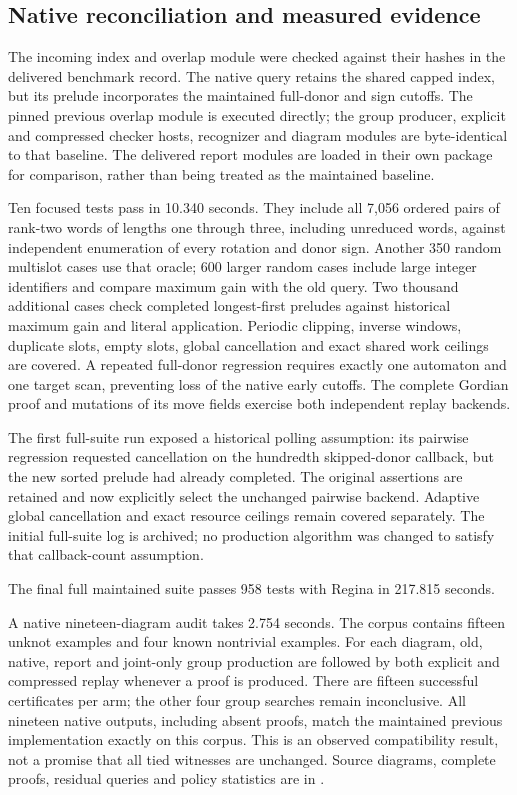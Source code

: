 \subsection{Native reconciliation and measured evidence}

The incoming index and overlap module were checked against their hashes in
the delivered benchmark record. The native query retains the shared capped
index, but its prelude incorporates the maintained full-donor and sign
cutoffs. The pinned previous overlap module is executed directly; the group
producer, explicit and compressed checker hosts, recognizer and diagram
modules are byte-identical to that baseline. The delivered report modules
are loaded in their own package for comparison, rather than being treated
as the maintained baseline.

Ten focused tests pass in 10.340 seconds. They include all 7,056 ordered pairs
of rank-two words of lengths one through three, including unreduced words,
against independent enumeration of every rotation and donor sign. Another
350 random multislot cases use that oracle; 600 larger random cases include
large integer identifiers and compare maximum gain with the old query.
Two thousand additional cases check completed longest-first preludes against
historical maximum gain and literal application. Periodic clipping, inverse
windows, duplicate slots, empty slots, global cancellation and exact shared
work ceilings are covered. A repeated full-donor regression requires exactly
one automaton and one target scan, preventing loss of the native early cutoffs.
The complete Gordian proof and mutations of its move fields exercise both
independent replay backends.

The first full-suite run exposed a historical polling assumption: its
pairwise regression requested cancellation on the hundredth skipped-donor
callback, but the new sorted prelude had already completed. The original
assertions are retained and now explicitly select the unchanged pairwise
backend. Adaptive global cancellation and exact resource ceilings remain
covered separately. The initial full-suite log is archived; no production
algorithm was changed to satisfy that callback-count assumption.


The final full maintained suite passes 958 tests with Regina in 217.815 seconds.

A native nineteen-diagram audit takes 2.754 seconds. The corpus contains
fifteen unknot examples and four known nontrivial examples. For each diagram,
old, native, report and joint-only group production are followed by both
explicit and compressed replay whenever a proof is produced. There are
fifteen successful certificates per arm; the other four group searches
remain inconclusive. All nineteen native outputs, including absent proofs,
match the maintained previous implementation exactly on this corpus. This
is an observed compatibility result, not a promise that all tied witnesses
are unchanged. Source diagrams, complete proofs, residual queries and policy
statistics are in .

